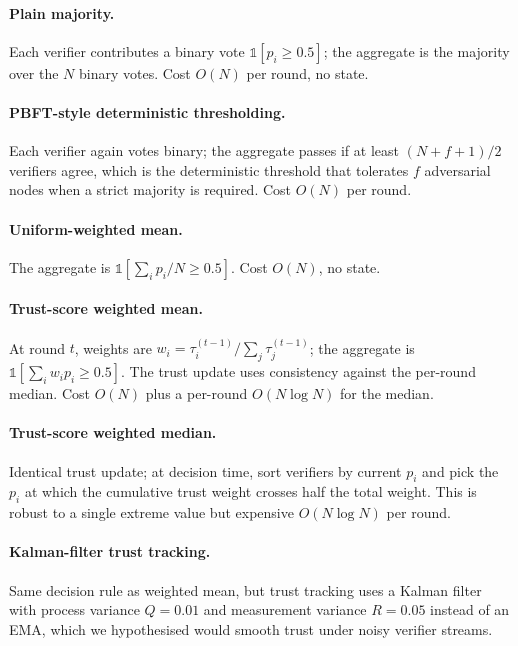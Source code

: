 \documentclass[11pt]{article}
\begin{document}
\paragraph{Plain majority.}
\label{sub:majority}
Each verifier contributes a binary vote $\mathbb{1}[p_i \geq 0.5]$; the
aggregate is the majority over the $N$ binary votes. Cost $O(N)$ per
round, no state.

\paragraph{PBFT-style deterministic thresholding.}
\label{sub:pbft}
\citep{castro1999pbft} Each verifier again votes binary; the aggregate
passes if at least $(N+f+1)/2$ verifiers agree, which is the
deterministic threshold that tolerates $f$ adversarial nodes when a
strict majority is required. Cost $O(N)$ per round.

\paragraph{Uniform-weighted mean.}
\label{sub:uniform}
The aggregate is $\mathbb{1}[\sum_i p_i / N \geq 0.5]$. Cost $O(N)$,
no state.

\paragraph{Trust-score weighted mean.}
\label{sub:trustmean}
At round $t$, weights are $w_i = \tau_i^{(t-1)} / \sum_j \tau_j^{(t-1)}$;
the aggregate is $\mathbb{1}[\sum_i w_i p_i \geq 0.5]$. The trust
update uses consistency against the per-round median. Cost $O(N)$
plus a per-round $O(N \log N)$ for the median.

\paragraph{Trust-score weighted median.}
\label{sub:trustmedian}
Identical trust update; at decision time, sort verifiers by current
$p_i$ and pick the $p_i$ at which the cumulative trust weight crosses
half the total weight. This is robust to a single extreme value but
expensive $O(N \log N)$ per round.

\paragraph{Kalman-filter trust tracking.}
\label{sub:kalman}
Same decision rule as weighted mean, but trust tracking uses a
Kalman filter with process variance $Q = 0.01$ and measurement
variance $R = 0.05$ instead of an EMA, which we hypothesised would
smooth trust under noisy verifier streams.
\end{document}
